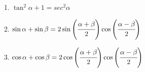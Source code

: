\documentclass[letterpaper,11pt]{article}
\begin{document}
\begin{enumerate}
{\begin{multicols}{2}
\begin{enumerate}
        \item $\tan^2\alpha + 1 = sec^2\alpha$
        
        \columnbreak
        
        \item $\sin\alpha + \sin\beta = 2\sin{\left(\cfrac{\alpha+\beta}{2}\right)}\cos{\left(\cfrac{\alpha-\beta}{2}\right)}$
        
        \item $\cos\alpha+\cos\beta = 2\cos{\left(\cfrac{\alpha+\beta}{2}\right)}\cos{\left(\cfrac{\alpha-\beta}{2}\right)}$
    \end{enumerate}
    \end{multicols}
    }


\end{enumerate}
\end{document}
